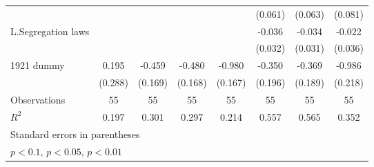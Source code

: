 {\begin{tabular}{l*{7}{c}}
                    &                     &                     &                     &                     &     (0.061)         &     (0.063)         &     (0.081)         \\
[1em]
L.Segregation laws  &                     &                     &                     &                     &      -0.036         &      -0.034         &      -0.022         \\
                    &                     &                     &                     &                     &     (0.032)         &     (0.031)         &     (0.036)         \\
[1em]
1921 dummy          &       0.195         &      -0.459\sym{***}&      -0.480\sym{***}&      -0.980\sym{***}&      -0.350\sym{*}  &      -0.369\sym{*}  &      -0.986\sym{***}\\
                    &     (0.288)         &     (0.169)         &     (0.168)         &     (0.167)         &     (0.196)         &     (0.189)         &     (0.218)         \\
\hline
Observations        &          55         &          55         &          55         &          55         &          55         &          55         &          55         \\
\(R^{2}\)           &       0.197         &       0.301         &       0.297         &       0.214         &       0.557         &       0.565         &       0.352         \\
\hline\hline
\multicolumn{8}{l}{\footnotesize Standard errors in parentheses}\\
\multicolumn{8}{l}{\footnotesize \sym{*} \(p<0.1\), \sym{**} \(p<0.05\), \sym{***} \(p<0.01\)}\\
\end{tabular}
}
